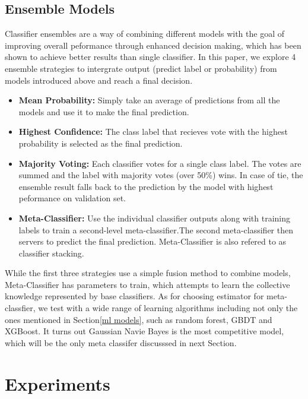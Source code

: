 \documentclass[11pt,a4paper]{article}
\begin{document}
\subsection{Ensemble Models\label{ensemble models}}
Classifier ensembles are a way of combining different models with the goal of improving overall peformance through enhanced decision making, which has been shown to achieve better results than single classifier. In this paper, we explore 4 ensemble strategies to intergrate output (predict label or probability) from models introduced above and reach a final decision.
\begin{itemize}
	\item \textbf{Mean Probability:}  Simply take an average of predictions from all the models and use it to make the final prediction.
	\item \textbf{Highest Confidence:} The class label that recieves vote with the highest probability is selected as the final prediction.
	\item \textbf{Majority Voting:} Each classifier votes for a single class label. The votes are summed and the label with majority votes (over 50\%) wins. In case of tie, the ensemble result falls back to the prediction by the model with highest peformance on validation set.
	\item \textbf{Meta-Classifier:} Use the individual classifier outputs along with training labels to train a second-level meta-classifier.The second meta-classifier then servers to predict the final prediction. Meta-Classifier is also refered to as classifier stacking.
\end{itemize}

While the first three strategies use a simple fusion method to combine models, Meta-Classifier has parameters to train, which attempts to learn the collective knowledge represented by base classifiers. As for choosing estimator for meta-classfier, we test with a wide range of learning algorithms including not only the ones mentioned in Section\ref{ml models}, such as random forest, GBDT and XGBoost. It turns out Gaussian Navie Bayes is the most competitive model, which will be the only meta classifer discusssed in next Section.

\section{Experiments\label{experiments}}
\end{document}
